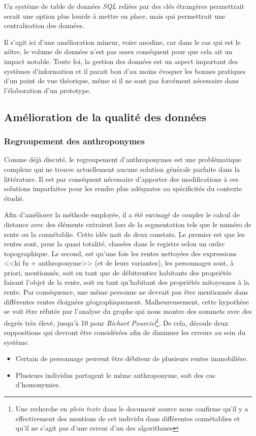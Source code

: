 Un système de table de données \textit{SQL}  reliées par des clés étrangères permettrait serait une option plus lourde à mettre en place, mais qui permettrait une centralisation des données. 

Il s'agit ici d'une amélioration mineur, voire anodine,  car dans le cas qui est le nôtre, le volume de données n'est pas assez conséquent pour que cela ait un impact notable. Toute foi, la gestion des données est un aspect important des systèmes d'information et il parait bon d'au moins évoquer les bonnes pratiques d'un point de vue théorique, même si il ne sont pas forcément nécessaire dans l'élaboration d'un prototype.

\subsection{Amélioration de la qualité des données}





\subsubsection{Regroupement des anthroponymes}
Comme déjà discuté, le regroupement d'anthroponymes est une problématique complexe qui ne trouve actuellement aucune solution générale parfaite dans la littérature. Il est par conséquent nécessaire d'apporter des modifications à ces solutions imparfaites pour les rendre plus adéquates au spécificités du contexte étudié.

Afin d'améliorer la méthode employée, il a été envisagé de coupler le calcul de distance avec des éléments extraient lors de la segmentation tels que le numéro de rente ou la connétablie. Cette idée nait  de deux constats.
Le premier est que les rentes sont, pour la quasi totalité, classées dans le registre selon un ordre topographique. Le second, est qu'une fois les rentes nettoyées des expressions <<ki fu + anthroponyme>> (et de leurs variantes), les personnages sont, à priori, mentionnés, soit en tant que de débitrentier habitants des propriétés faisant l'objet de la rente, soit en tant qu'habitant des propriétés mitoyennes à la rente. Par conséquence, une même personne ne devrait pas être mentionnée dans différentes rentes éloignées géographiquement. 
Malheureusement, cette hypothèse se voit être réfutée par l'analyse du graphe  qui nous montre des sommets avec des degrés très élevé, jusqu'à 10 pour \textit{Richart Pourciel}\footnote{Une recherche en \textit{plein texte} dans le document source nous confirme qu'il y a effectivement des mentions de cet individu dans différentes connétablies et qu'il ne s'agit pas d'une erreur d'un des algorithmes}.
De cela, découle deux suppositions qui devront être considérées afin de diminuer les erreurs au sein du système. 
\begin{itemize}
    \item Certain de personnage peuvent être débiteur de plusieurs rentes immobilière. 
    \item Plusieurs individus partagent le même anthroponyme, soit des cas d'homonymies.
\end{itemize}

